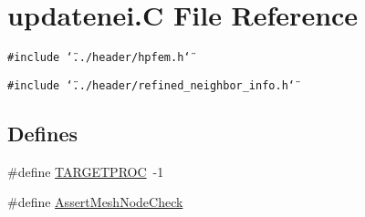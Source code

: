 \hypertarget{updatenei_8C}{
\section{updatenei.C File Reference}
\label{updatenei_8C}
}
{\tt \#include \char`\"{}../header/hpfem.h\char`\"{}}\par
{\tt \#include \char`\"{}../header/refined\_\-neighbor\_\-info.h\char`\"{}}\par
\subsection*{Defines}
\begin{CompactItemize}
\item 
\#define \hyperlink{updatenei_8C_a0}{TARGETPROC}\ -1
\item 
\#define \hyperlink{updatenei_8C_a1}{Assert\-Mesh\-Node\-Check}
\end{CompactItemize}
